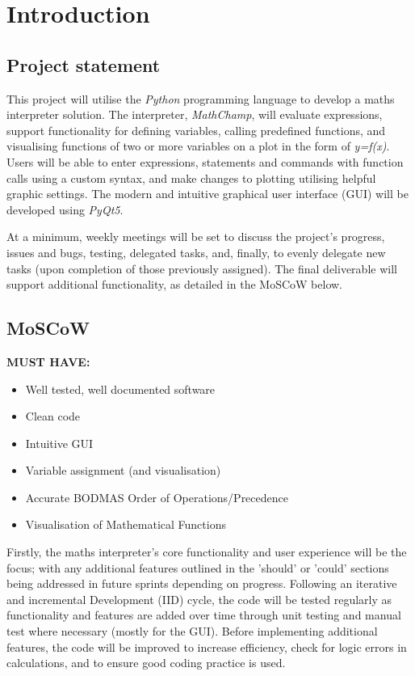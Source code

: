 \documentclass[a4paper, oneside, 11pt]{report}
\begin{document}
\chapter{Introduction} \label{chap:intro}

\section{Project statement}
This project will utilise the \emph{Python} programming language to develop a maths interpreter solution. The interpreter, \emph{MathChamp}, will evaluate expressions, support functionality for defining variables, calling predefined functions, and visualising functions of two or more variables on a plot in the form of \emph{y=f(x)}. Users will be able to enter expressions, statements and commands with function calls using a custom syntax, and make changes to plotting utilising helpful graphic settings. The modern and intuitive graphical user interface (GUI) will be developed using \emph{PyQt5}. 

At a minimum, weekly meetings will be set to discuss the project's progress, issues and bugs, testing, delegated tasks, and, finally, to evenly delegate new tasks (upon completion of those previously assigned). The final deliverable will support additional functionality, as detailed in the MoSCoW below.


\section{MoSCoW}
\textbf{MUST HAVE:} \label{MoSCoW-must}
\begin{itemize}
    \item Well tested, well documented software
    \item Clean code
    \item Intuitive GUI
    \item Variable assignment (and visualisation)
    
    \item Accurate BODMAS Order of Operations/Precedence
    \item Visualisation of Mathematical Functions
\end{itemize}

Firstly, the maths interpreter's core functionality and user experience will be the focus; with any additional features outlined in the 'should' or 'could' sections being addressed in future sprints depending on progress. Following an iterative and incremental Development (IID) cycle, the code will be tested regularly as functionality and features are added over time through unit testing and manual test where necessary (mostly for the GUI). Before implementing additional features, the code will be improved to increase efficiency, check for logic errors in calculations, and to ensure good coding practice is used.\\
\end{document}
